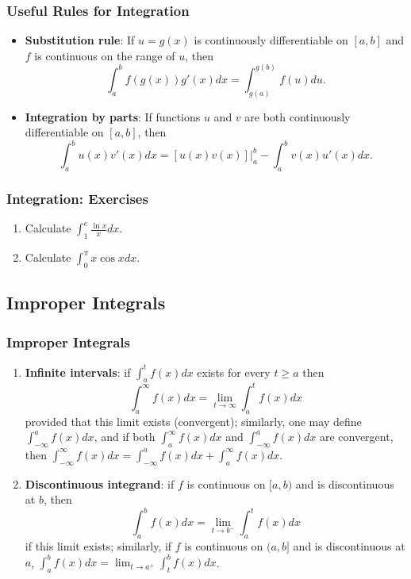 \documentclass{beamer}
\begin{document}
\begin{frame}
\frametitle{Useful Rules for Integration}
\begin{itemize}
\item \textbf{Substitution rule}: If $u=g(x)$ is continuously differentiable on $[a,b]$ and $f$ is continuous on the range of $u$, then 
$$
\int_a^b f(g(x))g'(x)dx = \int_{g(a)}^{g(b)} f(u)du.
$$ 
\item \textbf{Integration by parts}: If functions $u$ and $v$ are both continuously differentiable on $[a,b]$, then
$$
\int_{a}^{b} u(x)v'(x)dx = \left .[u(x)v(x)] \right\vert_{a}^{b} - \int_{a}^{b} v(x)u'(x)dx.
$$
\end{itemize}
\end{frame}

\begin{frame}
\frametitle{Integration: Exercises}
\begin{enumerate}
\item Calculate $\int_{1}^e \frac{\ln x}{x} dx$.
\vspace*{1.2in}
\item Calculate $\int_{0}^{\pi} x \cos x dx$.
\vspace*{1.2in}
\end{enumerate}
\end{frame}

\subsection{Improper Integrals}
\begin{frame}
\frametitle{Improper Integrals}
\begin{enumerate}
\item \textbf{Infinite intervals}: if $\int_{a}^{t}f(x)dx$ exists for every $t\geq a$ then 
$$
\int_{a}^{\infty}f(x)dx = \lim_{t \rightarrow \infty}\int_{a}^{t}f(x)dx
$$ 
provided that this limit exists (convergent); similarly, one may define $\int_{-\infty}^{a}f(x)dx$, and if both $\int_{a}^{\infty}f(x)dx$ and $\int_{-\infty}^{a}f(x)dx$ are convergent, then $\int_{-\infty}^{\infty}f(x)dx = \int_{-\infty}^{a}f(x)dx + \int_{a}^{\infty}f(x)dx$.
\item \textbf{Discontinuous integrand}: if $f$ is continuous on $[a,b)$ and is discontinuous at $b$, then
$$
\int_a^b f(x) dx = \lim_{t \rightarrow b^-} \int_a^t f(x)dx
$$
if this limit exists; similarly, if $f$ is continuous on $(a,b]$ and is discontinuous at $a$, $\int_a^b f(x) dx = \lim_{t \rightarrow a^+} \int_t^b f(x)dx$.
\end{enumerate}
\end{frame}
\end{document}

